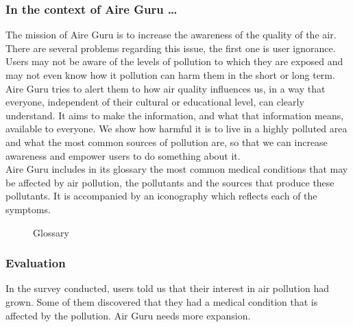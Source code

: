 \subsubsection*{In the context of Aire Guru \ldots}

The mission of Aire Guru is to increase the awareness of the quality of the air.
There are several problems regarding this issue, the first one is user ignorance. Users may not be
aware of the levels of pollution to which they are exposed and may not even know how it pollution can harm them
in the short or long term.\\

Aire Guru tries to alert them to how air quality influences us, in a way that everyone, independent of their cultural or educational level,
can clearly understand. It aims to make the information, and what that information means, available to everyone. We show how harmful it is to live in a highly polluted area and what the most common sources of pollution
are, so that we can increase awareness and empower users to do something about it.\\


Aire Guru includes in its glossary the most common medical conditions that may be affected by air pollution, the pollutants and the sources that produce these pollutants. It is accompanied by an iconography
which reflects each of the symptoms. \\

\begin{figure}[ht]
    \centering
    \hfill
  
  \caption{Glossary}
    \end{figure}

\subsubsection*{Evaluation}  

\begin{itemize}
    \done In the survey conducted, users told us that their interest in air pollution had grown. Some of them discovered that they had a medical condition that is affected by the pollution.
    \crossed Air Guru needs more expansion.
\end{itemize}